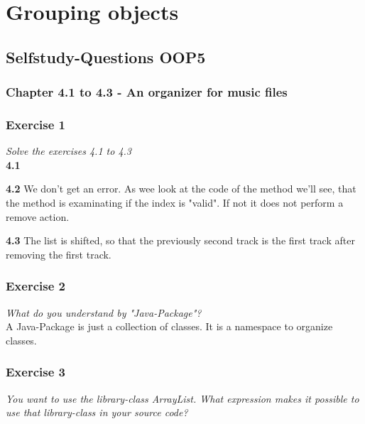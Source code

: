\section{Grouping objects}


\subsection{Selfstudy-Questions OOP5}

\subsubsection{Chapter 4.1 to 4.3 - An organizer for music files}

\subsubsection*{Exercise 1}
\textit{Solve the exercises 4.1 to 4.3}\\

\textbf{4.1}




\textbf{4.2} We don't get an error. As wee look at the code of the method
we'll see, that the method is examinating if the index is "valid". If not
it does not perform a remove action.



\textbf{4.3} The list is shifted, so that the previously second track is the
first track after removing the first track.

\subsubsection*{Exercise 2}
\textit{What do you understand by "Java-Package"?}\\

A Java-Package is just a collection of classes. It is a namespace to organize
classes.

\subsubsection*{Exercise 3}
\textit{You want to use the library-class ArrayList. What expression makes it
possible to use that library-class in your source code?}\\

